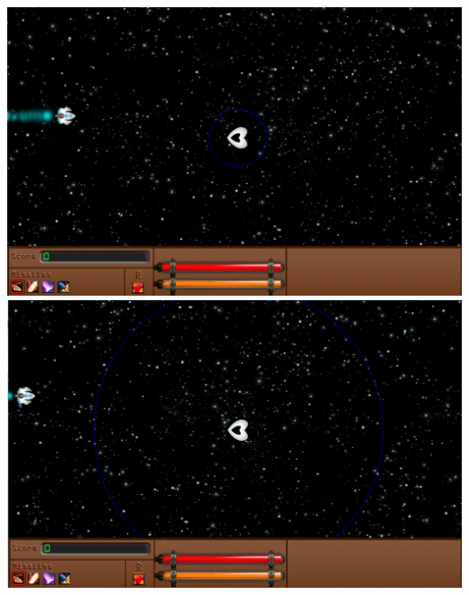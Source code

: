 \includegraphics{images/vaisseaux/support_little.png}
\includegraphics{images/vaisseaux/support_huge.png}
				\par~